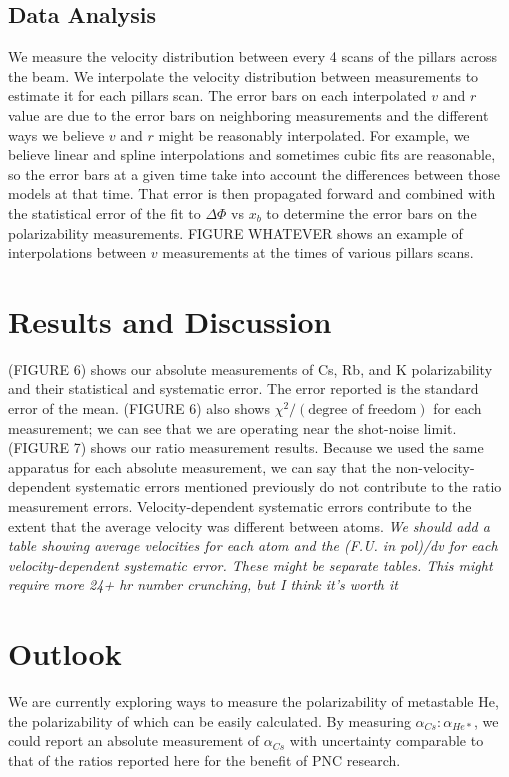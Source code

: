 \documentclass[12pt,letterpaper]{article}
\begin{document}
\subsection{Data Analysis}

We measure the velocity distribution between every 4 scans of the pillars across the beam. We interpolate the velocity distribution between measurements to estimate it for each pillars scan. The error bars on each interpolated $v$ and $r$ value are due to the error bars on neighboring measurements and the different ways we believe $v$ and $r$ might be reasonably interpolated. For example, we believe linear and spline interpolations and sometimes cubic fits are reasonable, so the error bars at a given time take into account the differences between those models at that time. That error is then propagated forward and combined with the statistical error of the fit to $\Delta\Phi$ vs $x_b$ to determine the error bars on the polarizability measurements. FIGURE WHATEVER shows an example of interpolations between $v$ measurements at the times of various pillars scans.

\section{Results and Discussion}

(FIGURE 6) shows our absolute measurements of Cs, Rb, and K polarizability and their statistical and systematic error. The error reported is the standard error of the mean. (FIGURE 6) also shows $\chi^2/(\text{degree of freedom})$ for each measurement; we can see that we are operating near the shot-noise limit. (FIGURE 7) shows our ratio measurement results. Because we used the same apparatus for each absolute measurement, we can say that the non-velocity-dependent systematic errors mentioned previously do not contribute to the ratio measurement errors. Velocity-dependent systematic errors contribute to the extent that the average velocity was different between atoms. \textit{We should add a table showing average velocities for each atom and the (F.U. in pol)/dv for each velocity-dependent systematic error. These might be separate tables. This might require more 24+ hr number crunching, but I think it's worth it} 

\section{Outlook}

We are currently exploring ways to measure the polarizability of metastable He, the polarizability of which can be easily calculated. By measuring $\alpha_{Cs}:\alpha_{He*}$, we could report an absolute measurement of $\alpha_{Cs}$ with uncertainty comparable to that of the ratios reported here for the benefit of PNC research.
\end{document}
